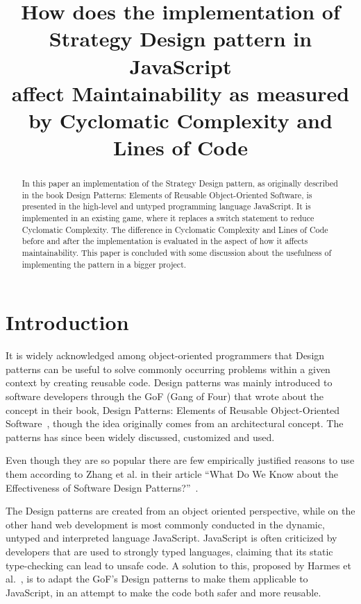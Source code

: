 \documentclass[conference, a4paper]{IEEEtran}
\begin{document}
\title{How does the implementation of\\
Strategy Design pattern in JavaScript\\
affect Maintainability as measured by Cyclomatic Complexity and Lines of Code}
\author{
}

\maketitle

\begin{abstract}
	 In this paper an implementation of the Strategy Design pattern, as originally described in the book Design Patterns: Elements of Reusable Object-Oriented Software, is presented in the high-level and untyped programming language JavaScript. It is implemented in an existing game, where it replaces a switch statement to reduce Cyclomatic Complexity. The difference in Cyclomatic Complexity and Lines of Code before and after the implementation is evaluated in the aspect of how it affects maintainability. This paper is concluded with some discussion about the usefulness of implementing the pattern in a bigger project.
\end{abstract}

\section{Introduction}
\label{sec:Introduction}
It is widely acknowledged among object-oriented programmers that Design patterns can be useful to solve commonly occurring problems within a given context  by creating reusable code. Design patterns was mainly introduced to software developers through the GoF (Gang of Four) that wrote about the concept in their book, Design Patterns: Elements of Reusable Object-Oriented Software~\cite{bibitem:GoF}, though the idea originally comes from an architectural concept. The patterns has since been widely discussed, customized and used.

Even though they are so popular there are few empirically justified reasons to use them according to Zhang et al. in their article ``What Do We Know about the Effectiveness of Software Design Patterns?''~\cite{bibitem:Zhang}.

The Design patterns are created from an object oriented perspective, while on the other hand web development is most commonly conducted in the dynamic, untyped and interpreted language JavaScript. JavaScript is often criticized by developers that are used to strongly typed languages, claiming that its static type-checking can lead to unsafe code. A solution to this, proposed by Harmes et al.~\cite{bibitem:DiazHarmes}, is to adapt the GoF's Design patterns to make them applicable to JavaScript, in an attempt to make the code both safer and more reusable.
\end{document}
